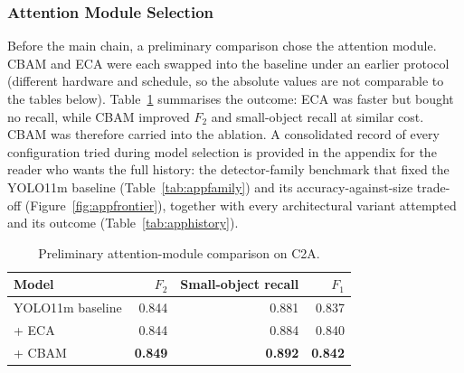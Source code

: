\subsubsection{Attention Module Selection}
Before the main chain, a preliminary comparison chose the attention module.
CBAM and ECA were each swapped into the baseline under an earlier protocol
(different hardware and schedule, so the absolute values are not comparable
to the tables below). Table~\ref{tab:eca} summarises the outcome: ECA was
faster but bought no recall, while CBAM improved $F_2$ and small-object
recall at similar cost. CBAM was therefore carried into the ablation. A
consolidated record of every configuration tried during model selection is
provided in the appendix for the reader who wants the full history: the
detector-family benchmark that fixed the YOLO11m baseline
(Table~\ref{tab:appfamily}) and its accuracy-against-size trade-off
(Figure~\ref{fig:appfrontier}), together with every architectural variant
attempted and its outcome (Table~\ref{tab:apphistory}).

\begin{table}[tbp]
  \centering
  \caption{Preliminary attention-module comparison on C2A.}
  \label{tab:eca}
  \begin{tabular}{@{}l r r r@{}}
    \toprule
    \bfseries\boldmath Model& \bfseries\boldmath $F_2$& \bfseries\boldmath Small-object recall& \bfseries\boldmath $F_1$\\
    \midrule
    YOLO11m baseline & 0.844 & 0.881 & 0.837 \\
    + ECA            & 0.844 & 0.884 & 0.840 \\
    + CBAM           & \textbf{0.849} & \textbf{0.892} & \textbf{0.842} \\
    \bottomrule
  \end{tabular}
\end{table}

